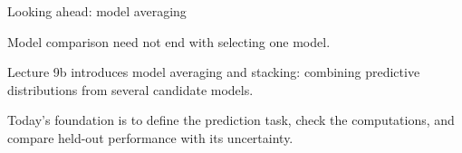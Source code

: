 \documentclass[10pt]{beamer}
\begin{document}
















\begin{frame}{Looking ahead: model averaging}

  Model comparison need not end with selecting one model.

  Lecture 9b introduces model averaging and stacking:
  combining predictive distributions from several candidate models.

  Today's foundation is to define the prediction task, check the computations,
  and compare held-out performance with its uncertainty.
\end{frame}


\end{document}
